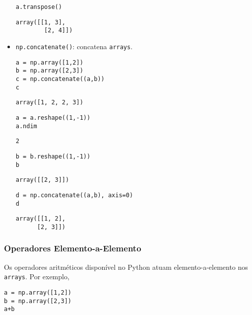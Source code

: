 \documentclass[12pt]{article}
\begin{document}
\begin{itemize}
\begin{lstlisting}
a.transpose()
\end{lstlisting}

\begin{verbatim}
array([[1, 3],
        [2, 4]])
\end{verbatim}

\item \lstinline+np.concatenate()+: concatena \lstinline+arrays+.

\begin{lstlisting}
a = np.array([1,2])
b = np.array([2,3])
c = np.concatenate((a,b))
c
\end{lstlisting}

\begin{verbatim}
array([1, 2, 2, 3])
\end{verbatim}

\begin{lstlisting}
a = a.reshape((1,-1))
a.ndim  
\end{lstlisting}

\begin{verbatim}
2
\end{verbatim}

\begin{lstlisting}
b = b.reshape((1,-1))
b
\end{lstlisting}

\begin{verbatim}
array([[2, 3]])
\end{verbatim}

\begin{lstlisting}
d = np.concatenate((a,b), axis=0)
d
\end{lstlisting}

\begin{verbatim}
array([[1, 2],
      [2, 3]])
\end{verbatim}

  \end{itemize}

\subsubsection{Operadores Elemento-a-Elemento}\label{subsubsection:ope-a-e}

Os operadores aritméticos disponível no Python atuam elemento-a-elemento nos \lstinline+arrays+. Por exemplo,

\begin{lstlisting}
a = np.array([1,2])
b = np.array([2,3])
a+b
\end{lstlisting}
\end{document}
